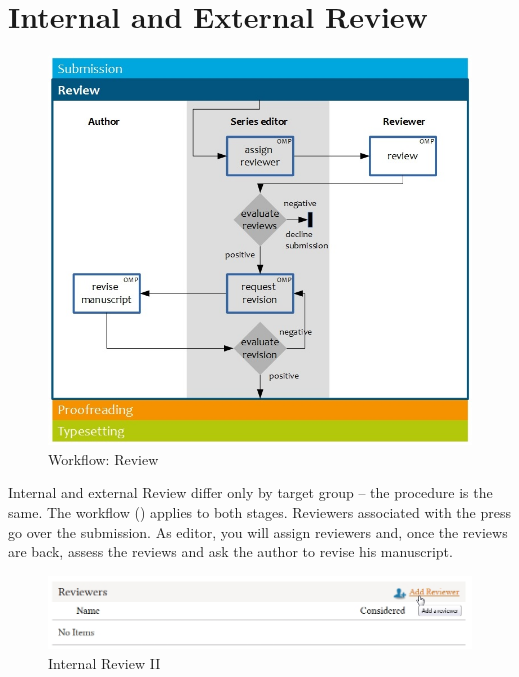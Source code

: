 
\section{Internal and External Review} 

\begin{figure}[h] \centering
\includegraphics[width=1\textwidth]{./img/workflow_review.jpg} \caption{Workflow:  Review}
\label{fig:review}
\end{figure}

Internal and external Review differ only by target group -- the procedure is the same. The workflow () applies to both stages. Reviewers associated with the press go over the submission. As editor, you will assign reviewers and, once the reviews are back, assess the reviews and ask the author to revise his manuscript.

\begin{figure}[h] \centering
\includegraphics[width=1\textwidth]{./img/addReviewer.jpg} \caption{Internal Review II}
\label{fig:addReviewer}
\end{figure}


